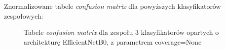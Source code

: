 \documentclass[polish,12pt]{aghthesis}
\begin{document}
\newpage
\noindent Znormalizowane tabele \textit{confusion matrix} dla powyższych klasyfikatorów zespołowych:
\begin{figure}[h!]%
    \begin{adjustbox}{minipage=1.0\paperwidth, pagecenter}
    \centering
    \qquad
    \end{adjustbox}
    \label{fig:eff-ens-3-None-matrices}
    \caption{Tabele \textit{confusion matrix} dla zespołu 3 klasyfikatorów opartych o architekturę EfficientNetB0, z parametrem coverage=None}
\end{figure}
\end{document}
